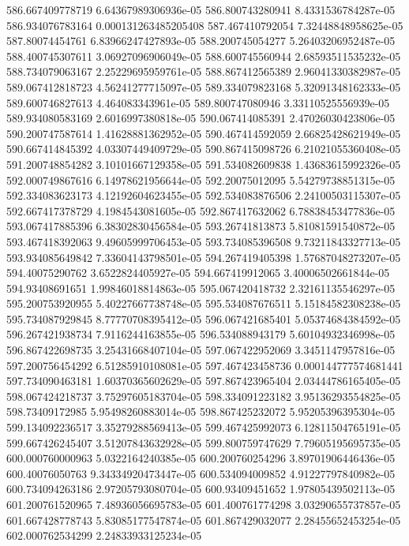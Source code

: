 {586.667409778719 6.64367989306936e-05
586.800743280941 8.4331536784287e-05
586.934076783164 0.000131263485205408
587.467410792054 7.32448848958625e-05
587.80074454761 6.83966247427893e-05
588.200745054277 5.26403206952487e-05
588.400745307611 3.06927096906049e-05
588.600745560944 2.68593511535232e-05
588.734079063167 2.25229695959761e-05
588.867412565389 2.96041330382987e-05
589.067412818723 4.56241277715097e-05
589.334079823168 5.32091348162333e-05
589.600746827613 4.464083343961e-05
589.800747080946 3.33110525556939e-05
589.934080583169 2.6016997380818e-05
590.067414085391 2.47026030423806e-05
590.200747587614 1.41628881362952e-05
590.467414592059 2.66825428621949e-05
590.667414845392 4.03307449409729e-05
590.867415098726 6.21021055360408e-05
591.200748854282 3.10101667129358e-05
591.534082609838 1.43683615992326e-05
592.000749867616 6.14978621956644e-05
592.20075012095 5.54279738851315e-05
592.334083623173 4.12192604623455e-05
592.534083876506 2.24100503115307e-05
592.667417378729 4.1984543081605e-05
592.867417632062 6.78838453477836e-05
593.067417885396 6.38302830456584e-05
593.26741813873 5.81081591540872e-05
593.467418392063 9.49605999706453e-05
593.734085396508 9.73211843327713e-05
593.934085649842 7.33604143798501e-05
594.267419405398 1.57687048273207e-05
594.40075290762 3.6522824405927e-05
594.667419912065 3.40006502661844e-05
594.93408691651 1.99846018814863e-05
595.067420418732 2.32161135546297e-05
595.200753920955 5.40227667738748e-05
595.534087676511 5.15184582308238e-05
595.734087929845 8.77770708395412e-05
596.067421685401 5.05374684384592e-05
596.267421938734 7.9116244163855e-05
596.534088943179 5.60104932346998e-05
596.867422698735 3.25431668407104e-05
597.067422952069 3.3451147957816e-05
597.200756454292 6.51285910108081e-05
597.467423458736 0.000144777574681441
597.734090463181 1.60370365602629e-05
597.867423965404 2.03444786165405e-05
598.067424218737 3.75297605183704e-05
598.334091223182 3.95136293554825e-05
598.73409172985 5.95498260883014e-05
598.867425232072 5.95205396395304e-05
599.134092236517 3.35279288569413e-05
599.467425992073 6.12811504765191e-05
599.667426245407 3.51207843632928e-05
599.800759747629 7.79605195695735e-05
600.000760000963 5.0322164240385e-05
600.200760254296 3.89701906446436e-05
600.40076050763 9.34334920473447e-05
600.534094009852 4.91227797840982e-05
600.734094263186 2.97205793080704e-05
600.93409451652 1.97805439502113e-05
601.200761520965 7.48936056695783e-05
601.400761774298 3.03290655737857e-05
601.667428778743 5.83085177547874e-05
601.867429032077 2.28455652453254e-05
602.000762534299 2.24833933125234e-05
}
